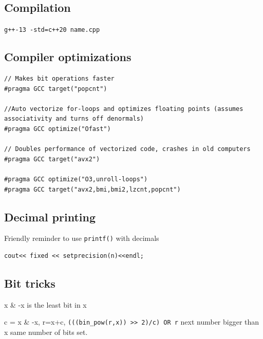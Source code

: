 \documentclass[10pt]{article}
\begin{document}
\begin{multicols*}{2}
\subsection{Compilation}

\texttt{g++-13 -std=c++20 name.cpp}

\subsection{Compiler optimizations}

\begin{lstlisting}[style=compactcpp]
// Makes bit operations faster
#pragma GCC target("popcnt") 

//Auto vectorize for-loops and optimizes floating points (assumes associativity and turns off denormals)
#pragma GCC optimize("Ofast")

// Doubles performance of vectorized code, crashes in old computers
#pragma GCC target("avx2")

#pragma GCC optimize("O3,unroll-loops")
#pragma GCC target("avx2,bmi,bmi2,lzcnt,popcnt")
\end{lstlisting}

\subsection{Decimal printing}

Friendly reminder to use \texttt{printf()} with decimals

\begin{lstlisting}[style=compactcpp]
cout<< fixed << setprecision(n)<<endl;
\end{lstlisting}

\subsection{Bit tricks}

x \& -x is the least bit in x

c = x \& -x, r=x+c, \texttt{(((bin\_pow(r,x)) >> 2)/c) OR r}  next number bigger than x same number of bits set.

\end{multicols*}
\end{document}
